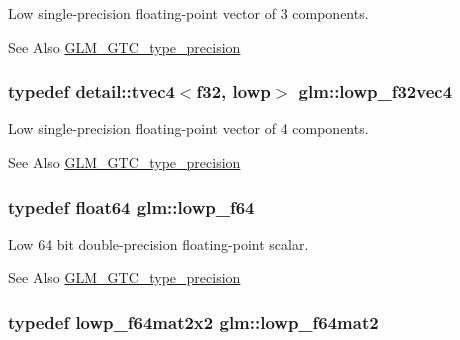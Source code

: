 Low single-\/precision floating-\/point vector of 3 components. \begin{DoxySeeAlso}{See Also}
\hyperlink{group__gtc__type__precision}{G\-L\-M\-\_\-\-G\-T\-C\-\_\-type\-\_\-precision} 
\end{DoxySeeAlso}
\hypertarget{group__gtc__type__precision_ga59f7292d7ed0b7df72e6aa31010e2648}{
\subsubsection[{lowp\-\_\-f32vec4}]{\setlength{\rightskip}{0pt plus 5cm}typedef detail\-::tvec4$<$f32, lowp$>$ {\bf glm\-::lowp\-\_\-f32vec4}}}\label{group__gtc__type__precision_ga59f7292d7ed0b7df72e6aa31010e2648}
Low single-\/precision floating-\/point vector of 4 components. \begin{DoxySeeAlso}{See Also}
\hyperlink{group__gtc__type__precision}{G\-L\-M\-\_\-\-G\-T\-C\-\_\-type\-\_\-precision} 
\end{DoxySeeAlso}
\hypertarget{group__gtc__type__precision_ga59839f4bf6b97c93b0def577890bbfb8}{
\subsubsection[{lowp\-\_\-f64}]{\setlength{\rightskip}{0pt plus 5cm}typedef float64 {\bf glm\-::lowp\-\_\-f64}}}\label{group__gtc__type__precision_ga59839f4bf6b97c93b0def577890bbfb8}
Low 64 bit double-\/precision floating-\/point scalar. \begin{DoxySeeAlso}{See Also}
\hyperlink{group__gtc__type__precision}{G\-L\-M\-\_\-\-G\-T\-C\-\_\-type\-\_\-precision} 
\end{DoxySeeAlso}
\hypertarget{group__gtc__type__precision_ga2984b3b0b6ee0657044d186bb875b4e3}{
\subsubsection[{lowp\-\_\-f64mat2}]{\setlength{\rightskip}{0pt plus 5cm}typedef lowp\-\_\-f64mat2x2 {\bf glm\-::lowp\-\_\-f64mat2}}}\label{group__gtc__type__precision_ga2984b3b0b6ee0657044d186bb875b4e3}
